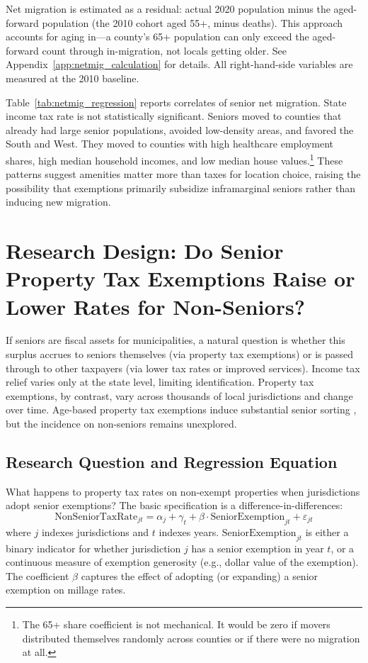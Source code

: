 \documentclass[11pt]{article}
\begin{document}
Net migration is estimated as a residual: actual 2020 population minus the aged-forward population (the 2010 cohort aged 55+, minus deaths). This approach accounts for aging in---a county's 65+ population can only exceed the aged-forward count through in-migration, not locals getting older. See Appendix~\ref{app:netmig_calculation} for details. All right-hand-side variables are measured at the 2010 baseline.


Table~\ref{tab:netmig_regression} reports correlates of senior net migration. State income tax rate is not statistically significant. Seniors moved to counties that already had large senior populations, avoided low-density areas, and favored the South and West. They moved to counties with high healthcare employment shares, high median household incomes, and low median house values.\footnote{The 65+ share coefficient is not mechanical. It would be zero if movers distributed themselves randomly across counties or if there were no migration at all.} These patterns suggest amenities matter more than taxes for location choice, raising the possibility that exemptions primarily subsidize inframarginal seniors rather than inducing new migration.







\section{Research Design: Do Senior Property Tax Exemptions Raise or Lower Rates for Non-Seniors?}

If seniors are fiscal assets for municipalities, a natural question is whether this surplus accrues to seniors themselves (via property tax exemptions) or is passed through to other taxpayers (via lower tax rates or improved services). Income tax relief varies only at the state level, limiting identification. Property tax exemptions, by contrast, vary across thousands of local jurisdictions and change over time. Age-based property tax exemptions induce substantial senior sorting \citep{banzhaf2021age}, but the incidence on non-seniors remains unexplored.

\subsection{Research Question and Regression Equation}
What happens to property tax rates on non-exempt properties when jurisdictions adopt senior exemptions? The basic specification is a difference-in-differences:
\begin{equation}
\text{NonSeniorTaxRate}_{jt} = \alpha_j + \gamma_t + \beta \cdot \text{SeniorExemption}_{jt} + \varepsilon_{jt}
\end{equation}
where $j$ indexes jurisdictions and $t$ indexes years. $\text{SeniorExemption}_{jt}$ is either a binary indicator for whether jurisdiction $j$ has a senior exemption in year $t$, or a continuous measure of exemption generosity (e.g., dollar value of the exemption). The coefficient $\beta$ captures the effect of adopting (or expanding) a senior exemption on millage rates.
\end{document}
